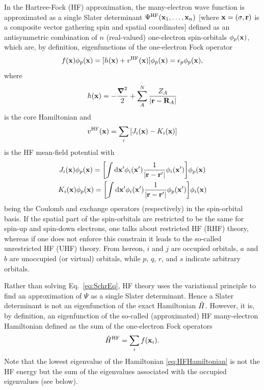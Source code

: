 \documentclass[11pt,a4paper]{article}
\newcommand{\hH}{\Hat{H}}
\begin{document}
In the Hartree-Fock (HF) approximation, the many-electron wave function is approximated as a single Slater determinant $\Psi^{\text{HF}}(\vb{x}_1,\ldots,\vb{x}_n)$ [where $\vb{x} = (\sigma,\vb{r})$ is a composite vector gathering spin and spatial coordinates] defined as an antisymmetric combination of $n$ (real-valued) one-electron spin-orbitals $\phi_p(\vb{x})$, which are, by definition, eigenfunctions of the one-electron Fock operator 
\begin{equation}\label{eq:FockOp}
	f(\vb{x}) \phi_p(\vb{x}) = [ h(\vb{x}) + v^\text{HF}(\vb{x}) ] \phi_p(\vb{x}) = \epsilon_p \phi_p(\vb{x}),
\end{equation}
where 
\begin{equation}
	h(\vb{x}) = -\frac{\grad^2}{2} + \sum_{A}^{N} \frac{Z_A}{\abs{\vb{r}-\vb{R}_A}}
\end{equation}
is the core Hamiltonian and 
\begin{equation}
	v^\text{HF}(\vb{x}) = \sum_i \qty[ J_i(\vb{x}) - K_i(\vb{x}) ]
\end{equation}
is the HF mean-field potential with 
\begin{subequations}
\begin{gather}
	\label{eq:CoulOp}
	J_i(\vb{x})\phi_p(\vb{x})=\qty[\int\dd\vb{x}'\phi_i(\vb{x}')\frac{1}{\abs{\vb{r} - \vb{r}'}}\phi_i(\vb{x}') ] \phi_p(\vb{x})
	\\
	\label{eq:ExcOp}
	K_i(\vb{x})\phi_p(\vb{x})=\qty[\int\dd\vb{x}'\phi_i(\vb{x}')\frac{1}{\abs{\vb{r} - \vb{r}'}}\phi_p(\vb{x}') ] \phi_i(\vb{x})
\end{gather}
\end{subequations}
being the Coulomb and exchange operators (respectively) in the spin-orbital basis. 
If the spatial part of the spin-orbitals are restricted to be the same for spin-up and spin-down electrons, one talks about restricted HF (RHF) theory, whereas if one does not enforce this constrain it leads to the so-called unrestricted HF (UHF) theory.
From hereon, $i$ and $j$ are occupied orbitals, $a$ and $b$ are unoccupied (or virtual) orbitals, while $p$, $q$, $r$, and $s$ indicate arbitrary orbitals.

Rather than solving Eq.~\eqref{eq:SchrEq}, HF theory uses the variational principle to find an approximation of $\Psi$ as a single Slater determinant. Hence a Slater determinant is not an eigenfunction of the exact Hamiltonian $\hH$. However, it is, by definition, an eigenfunction of the so-called (approximated) HF many-electron Hamiltonian defined as the sum of the one-electron Fock operators
\begin{equation}\label{eq:HFHamiltonian}
	\hH^{\text{HF}} = \sum_{i} f(\vb{x}_i).
\end{equation}
Note that the lowest eigenvalue of the Hamiltonian \eqref{eq:HFHamiltonian} is not the HF energy but the sum of the eigenvalues associated with the occupied eigenvalues (see below).
\end{document}
